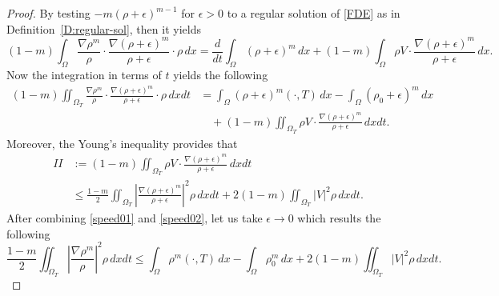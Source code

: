 \documentclass{amsart}
\numberwithin{equation}{section}
\newcommand{\abs}[1]{\left| #1 \right|}
\begin{document}
\begin{proof}
By testing $-m(\rho+\epsilon)^{m-1}$ for $\epsilon>0$ to a regular solution of \eqref{FDE} as in Definition~\ref{D:regular-sol}, then it yields 
\[
 (1-m)\int_{\Omega} \frac{\nabla \rho^{m}}{\rho} \cdot \frac{\nabla \left(\rho + \epsilon\right)^{m}}{\rho + \epsilon} \cdot \rho \, dx 
 = \frac{d}{dt}\int_{\Omega} \left(\rho+\epsilon\right)^m \,dx + 
(1-m) \int_{\Omega}  \rho V \cdot \frac{\nabla \left(\rho + \epsilon \right)^m}{\rho + \epsilon} \,dx .
\]
Now the integration in terms of $t$ yields the following
\begin{equation}\label{speed01}
\begin{aligned}
 (1-m)\iint_{\Omega_{T}} \frac{\nabla \rho^{m}}{\rho} \cdot \frac{\nabla \left(\rho + \epsilon\right)^{m}}{\rho + \epsilon} \cdot \rho \, dx dt
 &= \int_{\Omega} \left(\rho + \epsilon\right)^m (\cdot, T) \,dx - \int_{\Omega} \left(\rho_{0}+\epsilon\right)^{m} \,dx \\ 
 &\quad + 
(1-m) \iint_{\Omega_T} \rho V \cdot \frac{\nabla \left(\rho + \epsilon \right)^m}{\rho + \epsilon}  \,dxdt. 
\end{aligned}\end{equation}
Moreover, the Young's inequality provides that 
\begin{equation}\label{speed02}
\begin{aligned}
II &:= (1-m)\iint_{\Omega_T}  \rho V \cdot \frac{\nabla \left(\rho + \epsilon \right)^m}{\rho + \epsilon} \,dxdt \\
&\leq  \frac{1-m}{2}\iint_{\Omega_T} \abs{\frac{\nabla \left(\rho + \epsilon\right)^m}{\rho + \epsilon}}^2 \rho \,dxdt + 2(1-m)\iint_{\Omega_T} |V|^2 \rho \,dxdt. 
\end{aligned}\end{equation}
After combining \eqref{speed01} and \eqref{speed02}, let us take $\epsilon \to 0$ which results the following
\begin{equation*}\label{speed03}
 \frac{1-m}{2}\iint_{\Omega_{T}} \abs{\frac{\nabla \rho^{m}}{\rho}}^2  \rho \, dx dt
 \leq  \int_{\Omega} \rho^m (\cdot, T) \,dx - \int_{\Omega} \rho_{0}^{m} \,dx  + 
2(1-m) \iint_{\Omega_T} \abs{V}^2 \rho \,dxdt. 
\end{equation*}




\end{proof}
\end{document}
